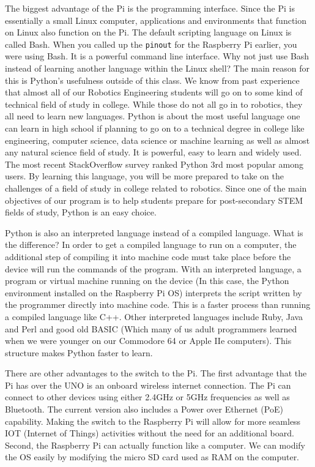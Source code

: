 \documentclass[
]{book}
\begin{document}
The biggest advantage of the Pi is the programming interface. Since the Pi is essentially a small Linux computer, applications and environments that function on Linux also function on the Pi. The default scripting language on Linux is called Bash. When you called up the \texttt{pinout} for the Raspberry Pi earlier, you were using Bash. It is a powerful command line interface. Why not just use Bash instead of learning another language within the Linux shell? The main reason for this is Python's usefulness outside of this class. We know from past experience that almost all of our Robotics Engineering students will go on to some kind of technical field of study in college. While those do not all go in to robotics, they all need to learn new languages. Python is about the most useful language one can learn in high school if planning to go on to a technical degree in college like engineering, computer science, data science or machine learning as well as almost any natural science field of study. It is powerful, easy to learn and widely used. The most recent StackOverflow survey ranked Python 3rd most popular among users. By learning this language, you will be more prepared to take on the challenges of a field of study in college related to robotics. Since one of the main objectives of our program is to help students prepare for post-secondary STEM fields of study, Python is an easy choice.

Python is also an interpreted language instead of a compiled language. What is the difference? In order to get a compiled language to run on a computer, the additional step of compiling it into machine code must take place before the device will run the commands of the program. With an interpreted language, a program or virtual machine running on the device (In this case, the Python environment installed on the Raspberry Pi OS) interprets the script written by the programmer directly into machine code. This is a faster process than running a compiled language like C++. Other interpreted languages include Ruby, Java and Perl and good old BASIC (Which many of us adult programmers learned when we were younger on our Commodore 64 or Apple IIe computers). This structure makes Python faster to learn.

There are other advantages to the switch to the Pi. The first advantage that the Pi has over the UNO is an onboard wireless internet connection. The Pi can connect to other devices using either 2.4GHz or 5GHz frequencies as well as Bluetooth. The current version also includes a Power over Ethernet (PoE) capability. Making the switch to the Raspberry Pi will allow for more seamless IOT (Internet of Things) activities without the need for an additional board. Second, the Raspberry Pi can actually function like a computer. We can modify the OS easily by modifying the micro SD card used as RAM on the computer.
\end{document}
